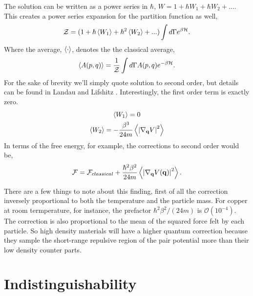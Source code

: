 %
The solution can be written as a power series in $\hbar$, $W = 1 + \hbar W_1 +
\hbar W_2 + ...$.  This creates a power series expansion for the partition
function as well,
%
\begin{equation} \mathcal{Z} = (1 + \hbar \left\langle W_1 \right\rangle + \hbar^2 \left\langle W_2 \right\rangle+ ...)
\int d\Gamma e^{\beta\mathcal{H}}.  \end{equation}
%
Where the average, $\left\langle \cdot \right\rangle$, denotes the the classical average, 
%
\begin{equation} \langle A(p, q) \rangle = \frac{1}{\mathcal{Z}} \int d\Gamma A(p, q)
e^{-\beta \mathcal{H}}.  \end{equation}
%
For the sake of brevity we'll simply quote solution to second order, but
details can be found in Landau and Lifshitz \cite{LANDAU198079}.
Interestingly, the first order term is exactly zero.
%
\begin{gather} \left\langle W_1 \right\rangle= 0 \\ \left\langle W_2 \right\rangle = - \frac{\beta^3}{24 m} \left\langle \left\vert
\nabla_{\mathbf{q}} V \right\vert^2 \right\rangle \end{gather}
%
In terms of the free energy, for example, the corrections to second order would
be, 
%
\begin{equation}{\label{quantumcorr}} \mathcal{F} = \mathcal{F}_{classical} +
\frac{\hbar^2\beta^2}{24m} \left\langle  \left\vert \nabla_{\mathbf{q}} V(\mathbf{q}) \right\vert^2  \right\rangle.
\end{equation}

There are a few things to note about this finding, first of all the correction
inversely proportional to both the temperature and the particle mass.  For
copper at room termperature, for instance, the prefactor $\hbar^2\beta^2/(24
m)$ is $\mathcal{O}(10^{-4})$.  The correction is also proportional to the mean
of the squared force felt by each particle. So high density materials will have
a higher quantum correction because they sample the short-range repulsive
region of the pair potential more than their low density counter parts.

\section{Indistinguishability} %

